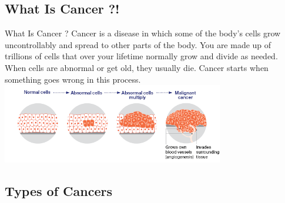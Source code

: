 \documentclass{beamer}
\begin{document}
    \subsection{What Is Cancer ?!}
    \begin{frame}{What Is Cancer ?} 
      \centering
      Cancer is a disease in which some of the body’s cells grow uncontrollably and spread to other parts of the body. 
      You are made up of trillions of cells that over your lifetime normally grow and divide as needed. When cells are abnormal or get old, they usually die. Cancer starts when something goes wrong in this process.
      \vfill
      \includegraphics[height=3.5cm]{resources/How_cancer_starts}
    \end{frame}
    \subsection{Types of Cancers}
\end{document}
